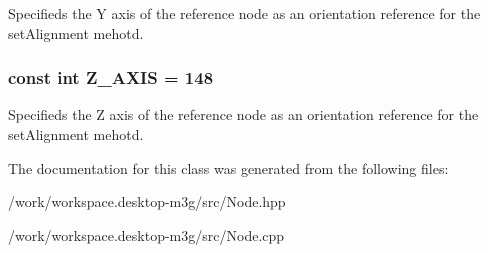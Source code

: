Specifieds the Y axis of the reference node as an orientation reference for the setAlignment mehotd. \hypertarget{classm3g_1_1Node_a928e648c9ae9b4706937831f77f0c67}{
\subsubsection[{Z\_\-AXIS}]{\setlength{\rightskip}{0pt plus 5cm}const int {\bf Z\_\-AXIS} = 148}}
\label{classm3g_1_1Node_a928e648c9ae9b4706937831f77f0c67}


Specifieds the Z axis of the reference node as an orientation reference for the setAlignment mehotd. 

The documentation for this class was generated from the following files:\begin{CompactItemize}
\item 
/work/workspace.desktop-m3g/src/Node.hpp\item 
/work/workspace.desktop-m3g/src/Node.cpp\end{CompactItemize}
